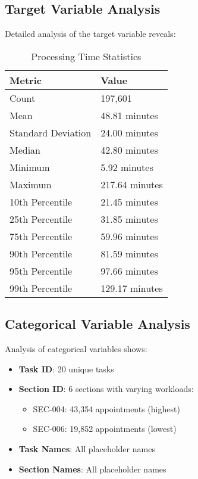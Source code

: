 \documentclass[12pt,a4paper]{article}
\begin{document}
\subsection{Target Variable Analysis}

Detailed analysis of the target variable reveals:

\begin{table}[H]
\centering
\caption{Processing Time Statistics}
\begin{tabular}{@{}ll@{}}
\toprule
\textbf{Metric} & \textbf{Value} \\
\midrule
Count & 197,601 \\
Mean & 48.81 minutes \\
Standard Deviation & 24.00 minutes \\
Median & 42.80 minutes \\
Minimum & 5.92 minutes \\
Maximum & 217.64 minutes \\
10th Percentile & 21.45 minutes \\
25th Percentile & 31.85 minutes \\
75th Percentile & 59.96 minutes \\
90th Percentile & 81.59 minutes \\
95th Percentile & 97.66 minutes \\
99th Percentile & 129.17 minutes \\
\bottomrule
\end{tabular}
\end{table}

\subsection{Categorical Variable Analysis}

Analysis of categorical variables shows:

\begin{itemize}
    \item \textbf{Task ID}: 20 unique tasks
    \item \textbf{Section ID}: 6 sections with varying workloads:
        \begin{itemize}
            \item SEC-004: 43,354 appointments (highest)
            \item SEC-006: 19,852 appointments (lowest)
        \end{itemize}
    \item \textbf{Task Names}: All placeholder names
    \item \textbf{Section Names}: All placeholder names
\end{itemize}
\end{document}
